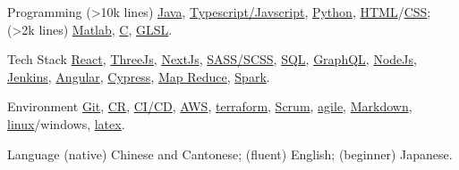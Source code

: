 
\begin{cvskills}
  \cvskill
    {Programming}
    {(>10k lines) 
    \href{https://www.java.com/en/}{Java}, 
    \href{https://www.javascript.com/}{Typescript/Javscript},
    \href{https://www.python.org/}{Python}, 
    \href{https://developer.mozilla.org/en-US/docs/Glossary/HTML5}{HTML}/\href{https://developer.mozilla.org/en-US/docs/Web/CSS}{CSS}; 
    (>2k lines) 
    \href{https://uk.mathworks.com/products/matlab.html}{Matlab}, 
    \href{https://en.wikipedia.org/wiki/C_(programming_language)}{C}, 
    \href{https://www.khronos.org/opengl/wiki/OpenGL_Shading_Language}{GLSL}.}

  \cvskill
    {Tech Stack} %
    {\href{https://reactjs.org/}{React},
    \href{https://threejs.org/}{ThreeJs}, 
    \href{https://nextjs.org/}{NextJs}, 
    \href{https://sass-lang.com/}{SASS/SCSS}, 
    \href{https://en.wikipedia.org/wiki/SQL}{SQL},
    \href{https://graphql.org/}{GraphQL},
    \href{https://nodejs.org/en/}{NodeJs}, 
    \href{https://www.jenkins.io/}{Jenkins},
    \href{https://angular.io/}{Angular},
    \href{https://www.cypress.io/}{Cypress},
    \href{https://en.wikipedia.org/wiki/MapReduce}{Map Reduce},
    \href{https://spark.apache.org/}{Spark}.}  %



  \cvskill
    {Environment} %
    {\href{https://git-scm.com/}{Git}, 
    \href{https://en.wikipedia.org/wiki/Code_review}{CR}, 
    \href{https://www.redhat.com/en/topics/devops/what-is-ci-cd}{CI/CD}, 
    \href{https://aws.amazon.com/}{AWS}, 
    \href{https://www.terraform.io/}{terraform},
    \href{https://www.scrum.org/resources/what-is-scrum}{Scrum}, 
    \href{https://www.atlassian.com/agile}{agile}, 
    \href{https://en.wikipedia.org/wiki/Markdown}{Markdown}, 
    \href{https://en.wikipedia.org/wiki/Unix}{linux}/windows, 
    \href{https://www.latex-project.org/}{latex}.
    }

  \cvskill
    {Language}
    {(native) Chinese and Cantonese; (fluent) English; (beginner) Japanese.}

  
\end{cvskills}
